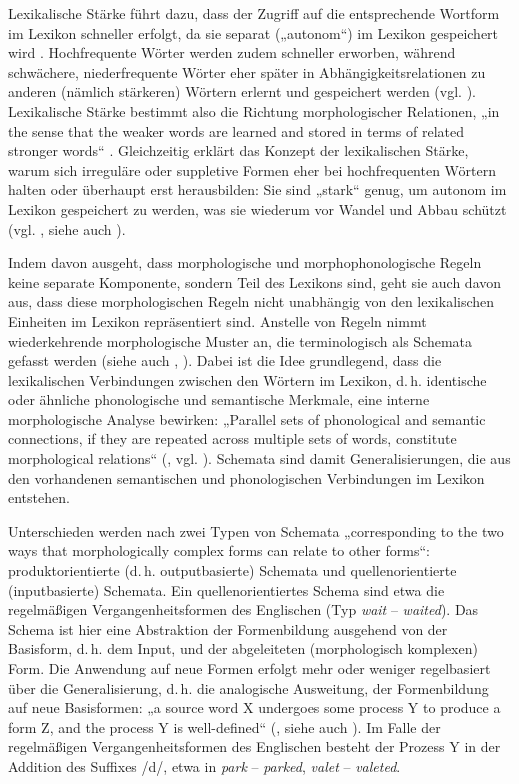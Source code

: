 Lexikalische Stärke führt dazu, dass der Zugriff auf die entsprechende Wortform im Lexikon schneller erfolgt, da sie separat („autonom“) im Lexikon gespeichert wird \citep[131]{Bybee1988}. Hochfrequente Wörter werden zudem schneller erworben, während schwächere, niederfrequente Wörter eher später in Abhängigkeitsrelationen zu anderen (nämlich stärkeren) Wörtern erlernt und gespeichert werden (vgl. \cites[57]{Bybee1985b}[132--134]{Bybee1988}). Lexikalische Stärke bestimmt also die Richtung morphologischer Relationen, „in the sense that the weaker words are learned and stored in terms of related stronger words“ \citep[134]{Bybee1988}. Gleichzeitig erklärt das Konzept der lexikalischen Stärke, warum sich irreguläre oder suppletive Formen eher bei hochfrequenten Wörtern halten oder überhaupt erst herausbilden: Sie sind „stark“ genug, um autonom im Lexikon gespeichert zu werden, was sie wiederum vor Wandel und Abbau schützt (vgl. \citealt[428]{Bybee1995}, siehe auch \cites[]{Bybee2006}[145--146]{Bybee2010}).

Indem \citet[135]{Bybee1988} davon ausgeht, dass morphologische und morphophonologische Regeln keine separate Komponente, sondern Teil des Lexikons sind, geht sie auch davon aus, dass diese morphologischen Regeln nicht unabhängig von den lexikalischen Einheiten im Lexikon repräsentiert sind. Anstelle von Regeln nimmt \citet{Bybee1985b, Bybee1988} wiederkehrende morphologische Muster an, die terminologisch als Schemata gefasst werden (siehe auch \citealt{BybeeModer1983}, \citealt{BybeeSlobin1982}). Dabei ist die Idee grundlegend, dass die lexikalischen Verbindungen zwischen den Wörtern im Lexikon, d.\,h. identische oder ähnliche phonologische und semantische Merkmale, eine interne morphologische Analyse bewirken: „Parallel sets of phonological and semantic connections, if they are repeated across multiple sets of words, constitute morphological relations“ (\citealt[429]{Bybee1995}, vgl. \citealt[127--129]{Bybee1988}). Schemata sind damit Generalisierungen, die aus den vorhandenen semantischen und phonologischen Verbindungen im Lexikon entstehen.

Unterschieden werden nach \citet[430]{Bybee1995} zwei Typen von Schemata „corresponding to the two ways that morphologically complex forms can relate to other forms“: produktorientierte (d.\,h. outputbasierte) Schemata und quellenorientierte (inputbasierte) Schemata. Ein quellenorientiertes Schema sind etwa die regelmäßigen Vergangenheitsformen des Englischen (Typ \textit{wait} -- \textit{waited}). Das Schema ist hier eine Abstraktion der Formenbildung ausgehend von der Basisform, d.\,h. dem Input, und der abgeleiteten (morphologisch komplexen) Form. Die Anwendung auf neue Formen erfolgt mehr oder weniger regelbasiert über die Generalisierung, d.\,h. die analogische Ausweitung, der Formenbildung auf neue Basisformen: „a source word X undergoes some process Y to produce a form Z, and the process Y is well-defined“ (\citealt[255]{BybeeModer1983}, siehe auch \citealt[285]{BybeeSlobin1982}). Im Falle der regelmäßigen Vergangenheitsformen des Englischen besteht der Prozess Y in der Addition des Suffixes /d/, etwa in \textit{park} -- \textit{parked}, \textit{valet} -- \textit{valeted}.

